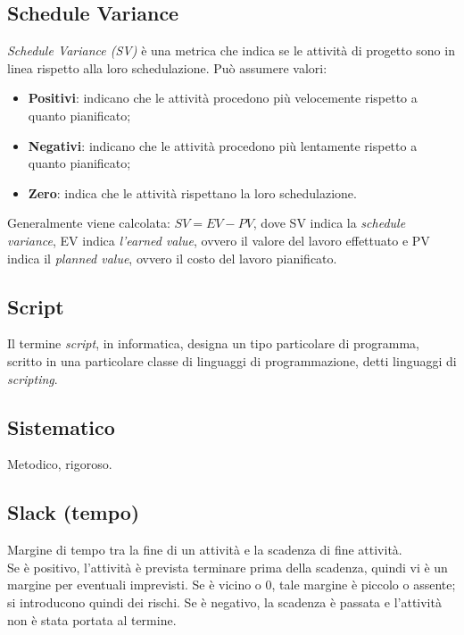 	\subsection{Schedule Variance}
	\label{sec:schedulevariance}
	\emph{Schedule Variance (SV)} è una metrica che indica se le attività di progetto sono in linea rispetto alla loro schedulazione.
	Può assumere valori:
	\begin{itemize}
	\item \textbf{Positivi}: indicano che le attività procedono più velocemente rispetto a quanto pianificato;
	\item \textbf{Negativi}: indicano che le attività procedono più lentamente rispetto a quanto pianificato;
	\item \textbf{Zero}: indica che le attività rispettano la loro schedulazione.
	\end{itemize}
	Generalmente viene calcolata: $SV = EV - PV$,
	dove SV indica la \emph{schedule variance}, EV indica \emph{l'earned value}, ovvero il valore del lavoro effettuato e PV indica il \emph{planned value}, ovvero il costo del lavoro pianificato.


	\subsection{Script}
	\label{sec:script}
	Il termine \emph{script}, in informatica, designa un tipo particolare di programma, scritto in una particolare classe di linguaggi di programmazione, detti linguaggi di \emph{scripting}.


	\subsection{Sistematico}
	\label{sec:sistematico}
	Metodico, rigoroso.


	\subsection{Slack (tempo)}
	\label{sec:slackt}
	Margine di tempo tra la fine di un attività e la scadenza di fine attività. \\
	Se è positivo, l'attività è prevista terminare prima della scadenza, quindi vi è un margine per eventuali imprevisti. Se è vicino o 0, tale margine è piccolo o assente; si introducono quindi dei rischi. Se è negativo, la scadenza è passata e l'attività non è stata portata al termine.


